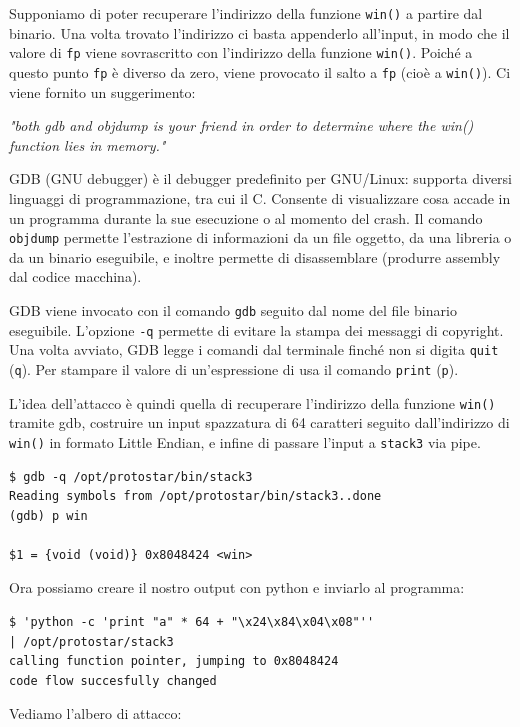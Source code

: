 Supponiamo di poter recuperare l'indirizzo della funzione \texttt{win()} a partire dal binario. Una volta trovato l'indirizzo ci basta appenderlo all'input, in modo che il valore di \texttt{fp} viene sovrascritto con l'indirizzo della funzione \texttt{win()}. Poiché a questo punto \texttt{fp} è diverso da zero, viene provocato il salto a \texttt{fp} (cioè a \texttt{win()}). Ci viene fornito un suggerimento:
\begin{center}
    \textit{"both gdb and objdump is your friend
in order to determine where the
win() function lies in memory."}
\end{center}
GDB (GNU debugger) è il debugger predefinito per GNU/Linux: supporta diversi linguaggi di programmazione, tra cui il C. Consente di visualizzare cosa accade in un programma durante la sue esecuzione o al momento del crash. Il comando \texttt{objdump} permette l'estrazione di informazioni da un file oggetto, da una libreria o da un binario eseguibile, e inoltre permette di disassemblare (produrre assembly dal codice macchina).

GDB viene invocato con il comando \texttt{gdb} seguito dal nome del file binario eseguibile. L'opzione \texttt{-q} permette di evitare la stampa dei messaggi di copyright. Una volta avviato, GDB legge i comandi dal terminale finché non si digita \texttt{quit} (\texttt{q}). Per stampare il valore di un'espressione di usa il comando \texttt{print} (\texttt{p}).

\vspace{5mm}

L'idea dell'attacco è quindi quella di recuperare l'indirizzo della funzione \texttt{win()} tramite gdb, costruire un input spazzatura di 64 caratteri seguito dall'indirizzo di \texttt{win()} in formato Little Endian, e infine di passare l'input a \texttt{stack3} via pipe.
\begin{mdframed}[backgroundcolor=white!20,shadow=false]
\begin{lstlisting}
$ gdb -q /opt/protostar/bin/stack3
Reading symbols from /opt/protostar/bin/stack3..done
(gdb) p win

$1 = {void (void)} 0x8048424 <win>

\end{lstlisting}
\end{mdframed}
Ora possiamo creare il nostro output con python e inviarlo al programma:
\begin{mdframed}[backgroundcolor=white!20,shadow=false]
\begin{lstlisting}
$ 'python -c 'print "a" * 64 + "\x24\x84\x04\x08"''
| /opt/protostar/stack3 
calling function pointer, jumping to 0x8048424
code flow succesfully changed
\end{lstlisting}
\end{mdframed}
Vediamo l'albero di attacco:

